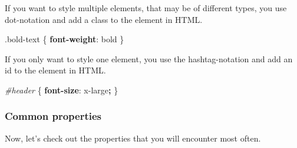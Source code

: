 \documentclass[
]{article}
\newenvironment{Shaded}{\begin{snugshade}}{\end{snugshade}}
\newcommand{\DecValTok}[1]{\textcolor[rgb]{0.00,0.00,0.81}{#1}}
\newcommand{\FunctionTok}[1]{\textcolor[rgb]{0.00,0.00,0.00}{#1}}
\newcommand{\KeywordTok}[1]{\textcolor[rgb]{0.13,0.29,0.53}{\textbf{#1}}}
\newcommand{\NormalTok}[1]{#1}
\newcommand{\OperatorTok}[1]{\textcolor[rgb]{0.81,0.36,0.00}{\textbf{#1}}}
\newcommand{\PreprocessorTok}[1]{\textcolor[rgb]{0.56,0.35,0.01}{\textit{#1}}}
\begin{document}
If you want to style multiple elements, that may be of different types, you use dot-notation and add a class to the element in HTML.

\begin{Shaded}
\begin{Highlighting}[]
\FunctionTok{.bold{-}text}\NormalTok{ \{                           }
  \KeywordTok{font{-}weight}\NormalTok{: }\DecValTok{bold}
\NormalTok{\}}
\end{Highlighting}
\end{Shaded}

If you only want to style one element, you use the hashtag-notation and add an id to the element in HTML.

\begin{Shaded}
\begin{Highlighting}[]
\PreprocessorTok{\#header}\NormalTok{ \{                           }
  \KeywordTok{font{-}size}\NormalTok{: }\DecValTok{x{-}large}\OperatorTok{;}
\NormalTok{\}}
\end{Highlighting}
\end{Shaded}

\hypertarget{common-properties}{%
\subsubsection*{Common properties}\label{common-properties}}

Now, let's check out the properties that you will encounter most often.
\end{document}

